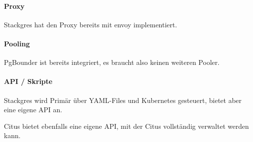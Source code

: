 \begin{flushleft}
    \paragraph{Proxy}
    Stackgres hat den Proxy bereits mit envoy\cite{QAGSHVBL} implementiert.
\end{flushleft}
\begin{flushleft}
    \paragraph{Pooling}
    PgBounder\cite{ATBELZ2X} ist bereits integriert, es braucht also keinen weiteren Pooler.
\end{flushleft}
\begin{flushleft}
    \paragraph{API / Skripte}
    Stackgres wird Primär über YAML-Files und Kubernetes gesteuert, bietet aber eine eigene API an.
\end{flushleft}
\begin{flushleft}
    Citus bietet ebenfalls eine eigene API, mit der Citus vollständig verwaltet werden kann.
\end{flushleft}
